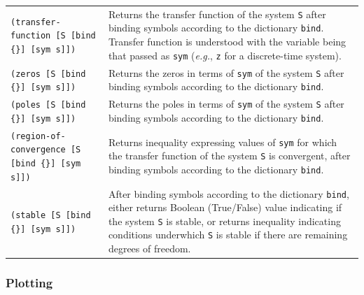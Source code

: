 \documentclass[11pt,letter]{article}
\begin{document}
\begin{longtable}{ p{} p{} }
  \texttt{(transfer-function [S [bind \{\}] [sym s]])}
  &
  Returns the transfer function of the system \texttt{S} after binding symbols according to the dictionary \texttt{bind}. Transfer function is understood with the variable being that passed as \lstinline!sym! (\emph{e.g.}, \lstinline!z! for a discrete-time system). \\

  \texttt{(zeros [S [bind \{\}] [sym s]])}
  &
  Returns the zeros in terms of \lstinline!sym! of the system \texttt{S} after binding symbols according to the dictionary \texttt{bind}. \\

  \texttt{(poles [S [bind \{\}] [sym s]])}
  &
  Returns the poles in terms of \lstinline!sym! of the system \texttt{S} after binding symbols according to the dictionary \texttt{bind}. \\

  \texttt{(region-of-convergence [S [bind \{\}] [sym s]])}
  &
  Returns inequality expressing values of \lstinline!sym! for which the transfer function of the system \texttt{S} is convergent, after binding symbols according to the dictionary \texttt{bind}. \\

  \texttt{(stable [S [bind \{\}] [sym s]])}
  &
  After binding symbols according to the dictionary \texttt{bind}, either returns Boolean (True/False) value indicating if the system \texttt{S} is stable, or returns inequality indicating conditions underwhich \texttt{S} is stable if there are remaining degrees of freedom.
\end{longtable}

\subsubsection{Plotting}
\end{document}

